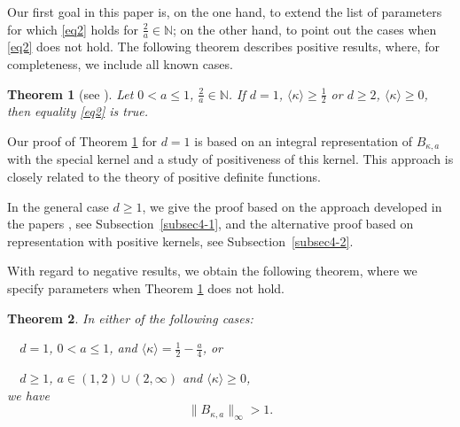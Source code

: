\documentclass[12pt,twoside,reqno]{amsart}\usepackage[cp1251]{inputenc}
\theoremstyle{plain}
\newtheorem{theorem}{Theorem}[section]
\theoremstyle{remark}
\begin{document}
Our first goal in this paper is, on the one hand,  to extend the list  of parameters for which
\eqref{eq2} holds for $\frac{2}{a}\in\mathbb{N}$; on the other hand, %
 to point out  the cases when \eqref{eq2} does not hold.
The following theorem  describes  positive results, %
 where, for completeness, we include all known cases.

\begin{theorem}[{see \cite[$d\ge 2$]{CBL18}}]\label{thm2}
Let $0<a\le 1$, $\frac{2}{a}\in\mathbb{N}$. If $d=1$, $\langle \kappa\rangle\ge\frac{1}{2}$ or $d\ge 2$, $\langle \kappa\rangle\ge 0$, then equality \eqref{eq2} is true.
\end{theorem}

Our proof of Theorem  \ref{thm2} for $d=1$ is based on an integral representation of $B_{\kappa,a}$ with the special kernel and a study of positiveness of this kernel.
 This approach is closely related to the theory of positive definite functions.


In the general case  $d\ge 1$, we  give the  proof based on the approach developed
in  the papers  \cite{BL20,CBL18,DD21}, see Subsection~\ref{subsec4-1}, and the alternative proof based on representation with positive kernels, see Subsection~\ref{subsec4-2}.


With regard to negative results, we obtain the following theorem, where we specify %
  parameters when Theorem \ref{thm2} does not hold. %

\begin{theorem}\label{thm4}
In either of the following cases:


\smallbreak
\textbullet\ \
$d=1$, $0<a\le 1$, and $\langle\kappa\rangle=\frac{1}{2}-\frac{a}{4}$, or

\smallbreak
\textbullet\ \ $d\ge 1$, $a\in (1,2)\cup (2,\infty)$ and $\langle\kappa\rangle\ge 0$,
\\ we have %
\begin{equation}\label{eq3}
\|B_{\kappa,a}\|_{\infty}>1.
\end{equation}
\end{theorem}
\end{document}
